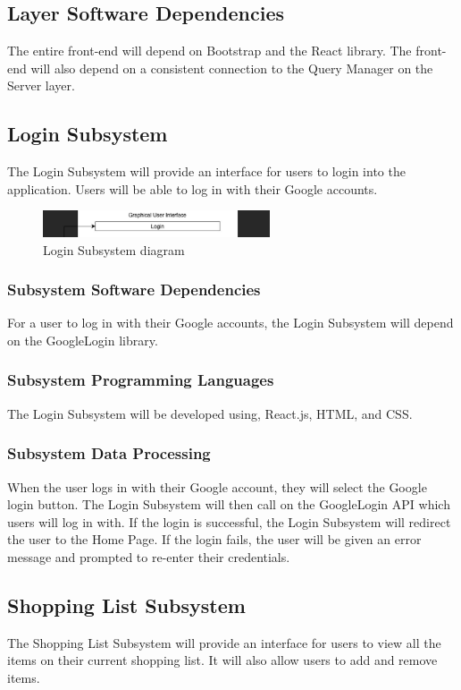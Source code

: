 \subsection{Layer Software Dependencies}
The entire front-end will depend on Bootstrap and the React library. The front-end will also depend on a consistent connection to the Query Manager on the Server layer.

\subsection{Login Subsystem}
The Login Subsystem will provide an interface for users to login into the application. Users will be able to log in with their Google accounts.


\begin{figure}[h!]
	\centering
 	\includegraphics[width=0.60\textwidth]{images/login}
 \caption{Login Subsystem diagram}
\end{figure}

\subsubsection{Subsystem Software Dependencies}
For a user to log in with their Google accounts, the Login Subsystem will depend on the GoogleLogin library.

\subsubsection{Subsystem Programming Languages}
The Login Subsystem will be developed using, React.js, HTML, and CSS.

\subsubsection{Subsystem Data Processing}
When the user logs in with their Google account, they will select the Google login button. The Login Subsystem will then call on the GoogleLogin API which users will log in with. If the login is successful, the Login Subsystem will redirect the user to the Home Page. If the login fails, the user will be given an error message and prompted to re-enter their credentials.

\subsection{Shopping List Subsystem}
The Shopping List Subsystem will provide an interface for users to view all the items on their current shopping list. It will also allow users to add and remove items.

